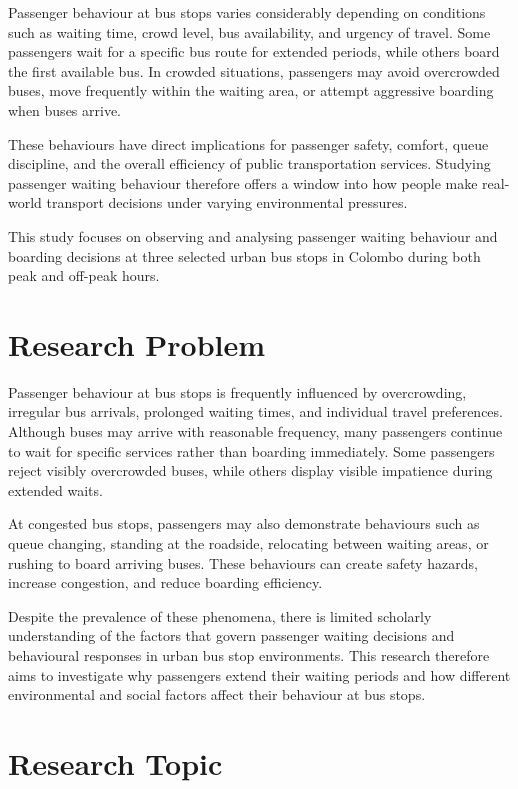 \documentclass[12pt, a4paper]{report}
\begin{document}
Passenger behaviour at bus stops varies considerably depending on conditions such as
waiting time, crowd level, bus availability, and urgency of travel. Some passengers wait
for a specific bus route for extended periods, while others board the first available bus. In
crowded situations, passengers may avoid overcrowded buses, move frequently within the
waiting area, or attempt aggressive boarding when buses arrive.

These behaviours have direct implications for passenger safety, comfort, queue discipline,
and the overall efficiency of public transportation services. Studying passenger waiting
behaviour therefore offers a window into how people make real-world transport decisions
under varying environmental pressures.

This study focuses on observing and analysing passenger waiting behaviour and boarding
decisions at three selected urban bus stops in Colombo during both peak and off-peak
hours.

\section{Research Problem}

Passenger behaviour at bus stops is frequently influenced by overcrowding, irregular bus
arrivals, prolonged waiting times, and individual travel preferences. Although buses may
arrive with reasonable frequency, many passengers continue to wait for specific services
rather than boarding immediately. Some passengers reject visibly overcrowded buses, while
others display visible impatience during extended waits.

At congested bus stops, passengers may also demonstrate behaviours such as queue
changing, standing at the roadside, relocating between waiting areas, or rushing to board
arriving buses. These behaviours can create safety hazards, increase congestion, and
reduce boarding efficiency.

Despite the prevalence of these phenomena, there is limited scholarly understanding of the
factors that govern passenger waiting decisions and behavioural responses in urban bus
stop environments. This research therefore aims to investigate why passengers extend their
waiting periods and how different environmental and social factors affect their behaviour at
bus stops.

\section{Research Topic}
\end{document}
